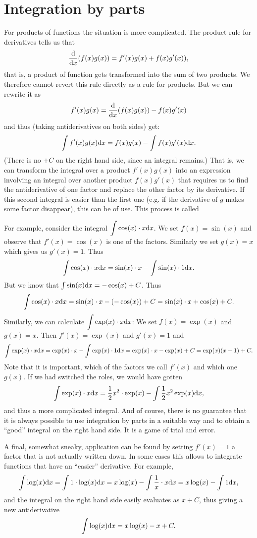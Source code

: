 \section{Integration by parts}

For products of functions the situation is more complicated. The product
rule for derivatives tells us that 
\[
\frac{\mbox{d}}{\mbox{d}x} (f(x)g(x))=f'(x)g(x)+f(x)g'(x)),
\]
that is, a product of function gets transformed into the sum of two
products. We therefore cannot revert this rule directly as a rule for
products. But we can rewrite it as
\[
f'(x)g(x)= \frac{\mbox{d}}{\mbox{d}x} (f(x)g(x))-f(x)g'(x)
\]
and thus (taking antiderivatives on both sides) get:
\[
\int f'(x)g(x){\mbox{d}}x=f(x)g(x)-\int f(x)g'(x){\mbox{d}}x.
\]
(There is no $+C$ on the right hand side, since an integral remains.)
That is, we can transform the integral over a product $f'(x)g(x)$ into an
expression involving an integral over another product $f(x)g'(x)$ that
requires us to find the antiderivative of one factor and replace the other
factor by its derivative. If this second integral is easier than the first
one (e.g. if the derivative of $g$ makes some factor disappear), this can be of
use. This process is called 

For example, consider the integral
$\displaystyle\int \cos(x)\cdot x{\mbox{d}}x$. We set $f(x)=\sin(x)$ and observe
that $f'(x)=\cos(x)$ is one of the factors. Similarly we set $g(x)=x$ which
gives us $g'(x)=1$. Thus
\[
\int\cos(x)\cdot x{\mbox{d}}x=\sin(x)\cdot x-\int \sin(x)\cdot 1{\mbox{d}}x.
\]
But we know that $\int\sin(x){\mbox{d}}x=-\cos(x)+C$. Thus
\[
\int\cos(x)\cdot x{\mbox{d}}x=\sin(x)\cdot x-(-\cos(x))+C=\sin(x)\cdot
x+\cos(x)+C.
\]
Similarly, we can calculate $\displaystyle\int \exp(x)\cdot x{\mbox{d}}x$:
We set $f(x)=\exp(x)$ and
$g(x)=x$. Then $f'(x)=\exp(x)$ and $g'(x)=1$ and
\[
\int\exp(x)\cdot x{\mbox{d}}x=\exp(x)\cdot x-\int \exp(x)\cdot
1{\mbox{d}}x=\exp(x)\cdot x-\exp(x)+C=\exp(x)(x-1)+C.
\]
Note that it is important, which of the factors we call $f'(x)$ and which
one $g(x)$. If we had switched the roles, we would have gotten
\[
\int\exp(x)\cdot x{\mbox{d}}x=\frac{1}{2}x^2\cdot \exp(x)
-\int \frac{1}{2}x^2\exp(x){\mbox{d}}x,
\]
and thus a more complicated integral. And of course, there is no guarantee
that it is always possible to use integration by parts in a suitable way and
to obtain a ``good'' integral on the right hand side. It is a game of trial
and error.

A final, somewhat sneaky, application can be found by setting $f'(x)=1$ a
factor that is not actually written down. In some cases this allows to
integrate functions that have an ``easier'' derivative. For example,
\[
\int \log(x){\mbox{d}}x=\int 1\cdot \log(x){\mbox{d}}x
=x\log(x)-\int \frac{1}{x}\cdot x{\mbox{d}}x
=x\log(x)-\int 1{\mbox{d}}x,
\]
and the integral on the right hand side easily evaluates as $x+C$,
thus giving a new antiderivative
\[
\int\log(x){\mbox{d}}x=x\log(x)-x+C.
\]

